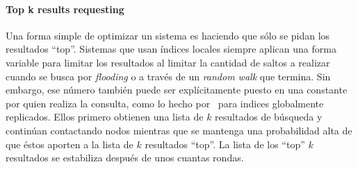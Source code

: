 \paragraph{Top k results requesting~\cite{cuenca2003planetp}} %
Una forma simple de optimizar un sistema es haciendo que sólo se pidan los
resultados ``top''. Sistemas que usan índices locales siempre aplican una forma
variable para limitar los resultados al limitar la cantidad de saltos a realizar
cuando se busca por \textit{flooding} o a través de un \textit{random walk} que
termina. Sin embargo, ese número también puede ser explícitamente puesto en una
constante por quien realiza la consulta, como lo hecho por~\citealt{cuenca2003planetp} %
para indices globalmente replicados. Ellos primero obtienen una lista de $k$
resultados de búsqueda y continúan contactando nodos mientras que se mantenga una
probabilidad alta de que éstos aporten a la lista de $k$ resultados ``top''. La lista de
los ``top'' $k$ resultados se estabiliza después de unos cuantas rondas.

